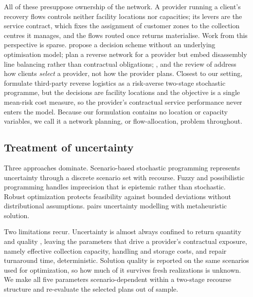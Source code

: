 \documentclass[11pt, a4paper]{article}
\begin{document}
All of these presuppose ownership of the network. A provider running a
client's recovery flows controls neither facility locations nor capacities; its levers are the service contract, which fixes the assignment of customer zones to the collection centres it manages, and
the flows routed once returns materialise. Work from this perspective
is sparse. \citet{Leung2013} propose a decision scheme without an
underlying optimisation model; \citet{Kannan2017} plan a reverse
network for a provider but embed disassembly line balancing rather than contractual obligations; \citet{Zabarkhshnia2020},
\citet{zheng2023power} and the review of \citet{anon2024third}
address how clients \emph{select} a provider, not how the provider
plans. Closest to our setting, \citet{chen2022reverse} formulate
third-party reverse logistics as a risk-averse two-stage stochastic
programme, but the decisions are facility locations and the objective is a single mean-risk cost measure, so the provider's contractual service performance never enters the model. Because our formulation contains no location or capacity variables, we call it a network planning, or flow-allocation, problem throughout.

\subsection{Treatment of uncertainty}
Three approaches dominate. Scenario-based stochastic programming \citep{zeballos2018integrating, liu2026online, luo2025two} represents uncertainty through a discrete scenario set with recourse. Fuzzy and possibilistic programming \citep{Soleimani2017, Nayeri2020, Sadeghi2021, Parast2021, argoubi2026sustainable} handles imprecision that is epistemic rather than stochastic. Robust optimization \citep{Yavari2019, Nayeri2020} protects feasibility against bounded deviations without distributional assumptions. \citet{Gholizadeh2022} pairs uncertainty modelling with metaheuristic solution.

Two limitations recur. Uncertainty is almost always confined to return quantity and quality \citep{zhao2026embedding}, leaving the parameters that drive a provider's contractual exposure, namely
effective collection capacity, handling and storage costs, and repair turnaround time, deterministic. Solution quality is reported on the same scenarios used for optimization, so how much of it survives fresh realizations is unknown. We make all five parameters scenario-dependent within a two-stage recourse structure and re-evaluate the selected plans out of sample.
\end{document}
